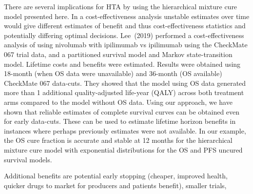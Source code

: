 \documentclass[AMA,STIX1COL]{WileyNJD-v2}
\begin{document}
There are several implications for HTA by using the hierarchical mixture cure model presented here.
In a cost-effectiveness analysis unstable estimates over time would give different estimates of benefit and thus cost-effectiveness statistics and potentially differing optimal decisions.
Lee~(2019)\cite{Lee2019} performed a cost-effectiveness analysis of using nivolumab with ipilimumab vs ipilimumab using the CheckMate 067 trial data, and a partitioned survival model and Markov state-transition model. Lifetime costs and benefits were estimated.
Results were obtained using 18-month (when OS data were unavailable) and 36-month (OS available) CheckMate 067 data-cuts. They showed that the model using OS data generated more than 1 additional quality-adjusted life-year (QALY) across both treatment arms compared to the model without OS data.
Using our approach, we have shown that reliable estimates of complete survival curves can be obtained even for early data-cuts. These can be used to estimate lifetime horizon benefits in instances where perhaps previously estimates were not available.
In our example, the OS cure fraction is accurate and stable at 12 months for the hierarchical mixture cure model with exponential distributions for the OS and PFS uncured survival models.

Additional benefits are potential early stopping (cheaper, improved health, quicker drugs to market for producers and patients benefit),
smaller trials,




\end{document}
